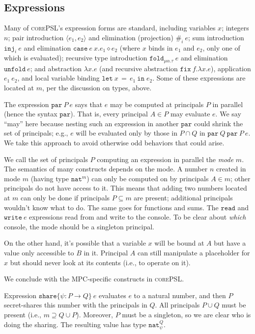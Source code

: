 \documentclass[10pt]{article}
\newcommand{\kw}[1]{\ensuremath{\mathtt{#1}}}
\newcommand{\tnat}{\ensuremath{\mathtt{nat}}}
\newcommand{\trec}[2]{\ensuremath{\mu {#1}.{#2}}}
\newcommand{\elet}[3]{\ensuremath{\kw{let}~#1\, =\, #2~\kw{in}\;{#3}}}
\newcommand{\epar}[2]{\ensuremath{\kw{par}~{#1}~{#2}}}
\newcommand{\econd}[3]{\ensuremath{\kw{case}~{#1}~x.{#2} \diamond {#3}}}
\newcommand{\eshare}[4]{\ensuremath{\kw{share}\{{#1}\!:\!{#2}\rightarrow{#3}\}~{#4}}}
\newcommand{\einj}[2]{\ensuremath{\kw{inj}_{#1}~{#2}}}
\newcommand{\eread}{\ensuremath{\kw{read}}}
\newcommand{\ewrite}[1]{\ensuremath{\kw{write}~{#1}}}
\newcommand{\epair}[2]{\ensuremath{\langle {#1}, {#2} \rangle}}
\newcommand{\eproj}[2]{\ensuremath{\kw{\#}}_{#1}~{#2}}
\newcommand{\elam}[2]{\ensuremath{\lambda {#1}.{#2}}}
\newcommand{\eapp}[2]{\ensuremath{{#1}~{#2}}}
\newcommand{\efix}[3]{\ensuremath{\kw{fix}~{#1}.\elam{#2}{#3}}}
\newcommand{\efold}[2]{\ensuremath{\kw{fold}_{#1}~{#2}}}
\newcommand{\eunfold}[1]{\ensuremath{\kw{unfold}~{#1}}}
\newcommand{\lang}{\textsc{corePSL}\xspace}
\begin{document}
\subsection{Expressions}

Many of \lang's expression forms are standard, including
variables $x$; integers $n$; pair introduction $\epair{e_1}{e_2}$ and
elimination (projection) $\eproj{i}{e}$; sum introduction
$\einj{i}{e}$ and elimination $\econd{e}{e_1}{e_2}$ (where $x$ binds
in $e_1$ and $e_2$, only one of which is evaluated); recursive type
introduction $\efold{\trec{\alpha}{\tau}}{e}$ and elimination
$\eunfold{e}$; and abstraction $\elam{x}{e}$ (and recursive
abstraction $\efix{f}{x}{e}$), application $\eapp{e_1}{e_2}$, and
local variable binding $\elet{x}{e_1}{e_2}$. Some of these expressions
are located at $m$, per the discussion on types, above.

The expression $\epar{P}{e}$ says that $e$ may be computed at
principals $P$ in parallel (hence the syntax $\kw{par}$). That is,
every principal $A \in P$ may evaluate $e$. We say ``may'' here
because nesting such an expression in another $\kw{par}$ could shrink
the set of principals; e.g., $e$ will be evaluated only by those in
$P \cap Q$ in $\epar{Q}{\epar{P}{e}}$. We take this approach to avoid
otherwise odd behaviors that could arise.

We call the set of principals $P$ computing an expression in parallel
the \emph{mode} $m$. The semantics of many constructs depends on the
mode. A number $n$ created in mode $m$ (having type $\tnat^m$) can
only be computed on by principals $A \in m$; other principals do not
have access to it. This means that adding two numbers located at $m$
can only be done if principals $P \subseteq m$ are present; additional
principals wouldn't know what to do. The same goes for functions and
sums. The $\eread$ and $\ewrite{e}$ expressions read from and write to
the console. To be clear about \emph{which} console, the mode should
be a singleton principal.

On the other hand, it's possible that a variable $x$ will be bound at
$A$ but have a value only accessible to $B$ in it. Principal $A$ can
still manipulate a placeholder for $x$ but should never look at its
contents (i.e., to operate on it).

We conclude with the MPC-specific constructs in \lang.

Expression $\eshare{\psi}{P}{Q}{e}$ evaluates $e$ to a natural number,
and then $P$ secret-shares this number with the principals in $Q$. All
principals $P \cup Q$ must be present (i.e.,
$m \supseteq Q \cup P$). Moreover, $P$ must be a singleton, so we
are clear who is doing the sharing. The resulting value has type
$\tnat^Q_\psi$.
\end{document}
